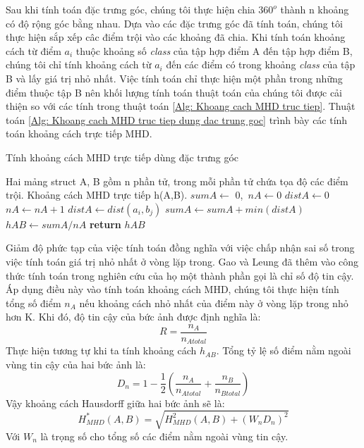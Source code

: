\documentclass[runningheads]{llncs}
\begin{document}
Sau khi tính toán đặc trưng góc, chúng tôi thực hiện chia $360^o$ thành n khoảng có độ rộng góc bằng nhau. Dựa vào các đặc trưng góc đã tính toán, chúng tôi thực hiện sắp xếp câc điểm trội vào các khoảng đã chia. Khi tính toán khoảng cách từ điểm $a_i$ thuộc khoảng số \textit{class} của tập hợp điểm A đến tập hợp điểm B, chúng tôi chỉ tính khoảng cách từ $a_i$ đến các điểm có trong khoảng \textit{class} của tập B và lấy giá trị nhỏ nhất. Việc tính toán chỉ thực hiện một phần trong những điểm thuộc tập B nên khối lượng tính toán thuật toán của chúng tôi được cải thiện so với các tính trong thuật toán \ref{Alg: Khoang cach MHD truc tiep}. Thuật toán \ref{Alg: Khoang cach MHD truc tiep dung dac trung goc} trình bày các tính toán khoảng cách trực tiếp MHD.
\begin{algorithm}
\caption{Tính khoảng cách MHD trực tiếp dùng đặc trưng góc}
\label{Alg: Khoang cach MHD truc tiep dung dac trung goc}
\begin{algorithmic}[1]
\Require Hai mảng struct A, B gồm n phần tử, trong mỗi phần tử chứa tọa độ các điểm trội.
\Ensure Khoảng cách MHD trực tiếp h(A,B).
    \State $sumA \gets$ 0,\ $nA \gets 0$
        \State $distA \gets 0$
        \State $nA \gets nA+1$
             \State $distA \gets dist(a_i, b_j)$ 
        \EndFor
        \State $sumA \gets sumA + min(distA)$ 
    \EndFor
    \EndFor
    \State $hAB \gets sumA / nA$ 
    \State \textbf{return} $hAB$
\end{algorithmic}
\end{algorithm}

Giảm độ phức tạp của việc tính toán đồng nghĩa với việc chấp nhận sai số trong việc tính toán giá trị nhỏ nhất ở vòng lặp trong. Gao và Leung \cite{gao2002face} đã thêm vào công thức tính toán trong nghiên cứu của họ một thành phần gọi là chỉ số độ tin cậy. Áp dụng điều này vào tính toán khoảng cách MHD, chúng tôi thực hiện tính tổng số điểm $n_{A}$ nếu khoảng cách nhỏ nhất của điểm này ở vòng lặp trong nhỏ hơn K. Khi đó, độ tin cậy của bức ảnh được định nghĩa là:
\begin{equation}
\label{congthuc: R}
R=\dfrac{n_{A}}{n_{Atotal}}
\end{equation}
Thực hiện tương tự khi ta tính khoảng cách $h_{AB}$. Tổng tỷ lệ số điểm nằm ngoài vùng tin cậy của hai bức ảnh là:
\begin{equation}
\label{congthuc: Dn}
D_{n}=1-\dfrac{1}{2}\left(\dfrac{n_{A}}{n_{Atotal}}+\dfrac{n_{B}}{n_{Btotal}}\right)
\end{equation}
Vậy khoảng cách Hausdorff giữa hai bức ảnh sẽ là:
\begin{equation}
\label{Eq: H_MHDsuadoi}
H_{MHD}^*(A,B)=\sqrt{H_{MHD}^2(A,B)+(W_{n}D_{n})^2}
\end{equation}
Với $W_{n}$ là trọng số cho tổng số các điểm nằm ngoài vùng tin cậy.
\end{document}
